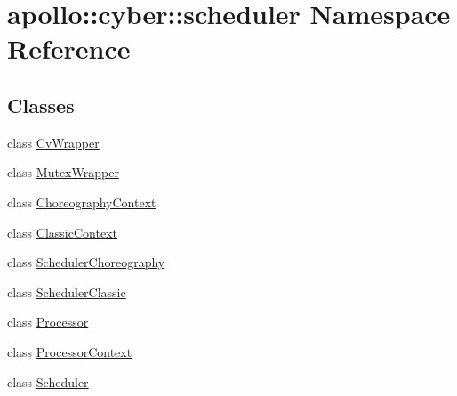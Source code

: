 \hypertarget{namespaceapollo_1_1cyber_1_1scheduler}{\section{apollo\-:\-:cyber\-:\-:scheduler Namespace Reference}
\label{namespaceapollo_1_1cyber_1_1scheduler}
}
\subsection*{Classes}
\begin{DoxyCompactItemize}
\item 
class \hyperlink{classapollo_1_1cyber_1_1scheduler_1_1CvWrapper}{Cv\-Wrapper}
\item 
class \hyperlink{classapollo_1_1cyber_1_1scheduler_1_1MutexWrapper}{Mutex\-Wrapper}
\item 
class \hyperlink{classapollo_1_1cyber_1_1scheduler_1_1ChoreographyContext}{Choreography\-Context}
\item 
class \hyperlink{classapollo_1_1cyber_1_1scheduler_1_1ClassicContext}{Classic\-Context}
\item 
class \hyperlink{classapollo_1_1cyber_1_1scheduler_1_1SchedulerChoreography}{Scheduler\-Choreography}
\item 
class \hyperlink{classapollo_1_1cyber_1_1scheduler_1_1SchedulerClassic}{Scheduler\-Classic}
\item 
class \hyperlink{classapollo_1_1cyber_1_1scheduler_1_1Processor}{Processor}
\item 
class \hyperlink{classapollo_1_1cyber_1_1scheduler_1_1ProcessorContext}{Processor\-Context}
\item 
class \hyperlink{classapollo_1_1cyber_1_1scheduler_1_1Scheduler}{Scheduler}
\end{DoxyCompactItemize}
